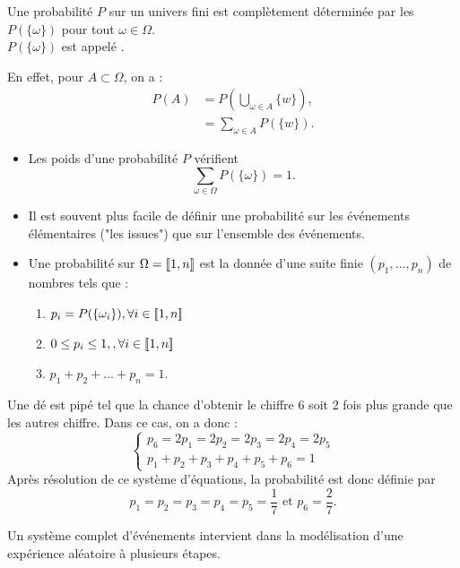 \documentclass{book}
\begin{document}
\begin{Proposition}
Une probabilité $P$ sur un univers fini est complètement déterminée par les $P(\{\omega\})$ pour tout $\omega \in \Omega$.\\
$P(\{\omega\})$ est appelé .
\end{Proposition}
\begin{Demonstration}
En effet, pour $A \subset \Omega$, on a :
$$\begin{aligned}
P(A)&=P(\bigcup\limits_{\omega\in A}\{w\} ),\\
 &=\sum_{\omega\in A}P(\{w\}).
\end{aligned}$$
\end{Demonstration}
\begin{Remarque}
\begin{itemize}
\item Les poids d'une probabilité $P$ vérifient
$$ \sum_{\omega \in \Omega}P(\{\omega\}) = 1.$$
\item Il est souvent plus facile de définir une probabilité sur les événements élémentaires ("les issues") que sur l'ensemble des événements.
\item Une probabilité sur $\Omega=\mathopen\lbrack\!\lbrack1,n \mathclose\rbrack\!\rbrack$ est la donnée d'une suite finie $(p_1,\ldots,p_n)$ de nombres tels que :
\begin{enumerate}
\item $p_i = P(\{\omega_i\}),\forall i\in\mathopen\lbrack\!\lbrack1,n \mathclose\rbrack\!\rbrack $
\item $0\leq p_i\leq 1,,\forall i\in\mathopen\lbrack\!\lbrack1,n \mathclose\rbrack\!\rbrack$
\item $p_1+p_2+\ldots+p_n=1.$
\end{enumerate}
\end{itemize}
\end{Remarque}
\begin{Exemple}
Une dé est pipé tel que la chance d'obtenir le chiffre 6 soit 2 fois plus grande que les autres chiffre. Dans ce cas, on a donc :
$$\begin{cases}
p_6=2 p_1=2 p_2=2 p_3=2 p_4=2 p_5 \\
p_1+p_2+p_3+p_4+p_5+p_6=1
\end{cases}$$
Après résolution de ce système d'équations, la probabilité est donc définie par
$$p_1=p_2=p_3=p_4=p_5=\frac 1 7 \text{ et }  p_6=\frac 2 7.$$
\end{Exemple}
Un système complet d'événements intervient dans la modélisation d'une expérience aléatoire à plusieurs étapes.
\end{document}
